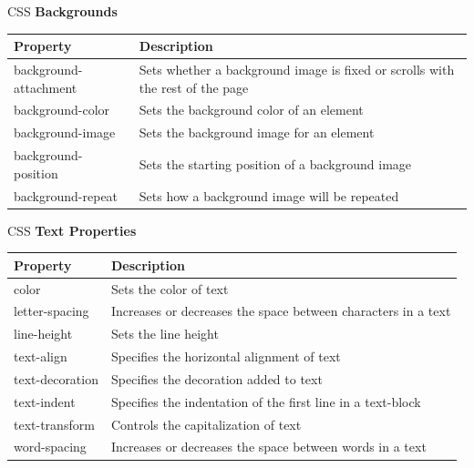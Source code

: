 \documentclass[14pt]{beamer}
\begin{document}
\begin{frame}{CSS}
\textbf{Backgrounds}

\begin{tabular}{|p{3cm} | p{7cm} |}
\hline
\textbf{Property} & \textbf{Description} \\ \hline
background-attachment &Sets whether a background image is fixed or scrolls with the rest of the page \\ \hline
background-color & Sets the background color of an element \\ \hline
background-image & Sets the background image for an element \\ \hline
background-position & Sets the starting position of a background image \\ \hline
background-repeat & Sets how a background image will be repeated \\ \hline
\end{tabular}
\end{frame}

\begin{frame}{CSS}
\textbf{Text Properties}

\small
\begin{tabular}{|p{3cm} | p{7cm} |}
\hline
\textbf{Property} & \textbf{Description} \\ \hline
color &Sets the color of text \\ \hline
letter-spacing & Increases or decreases the space between characters in a text\\ \hline
line-height & Sets the line height \\ \hline
text-align & Specifies the horizontal alignment of text \\ \hline
text-decoration & Specifies the decoration added to text \\ \hline
text-indent & Specifies the indentation of the first line in a text-block \\ \hline
text-transform & Controls the capitalization of text \\ \hline
word-spacing & Increases or decreases the space between words in a text \\ \hline 
\end{tabular}
\end{frame}
\end{document}
